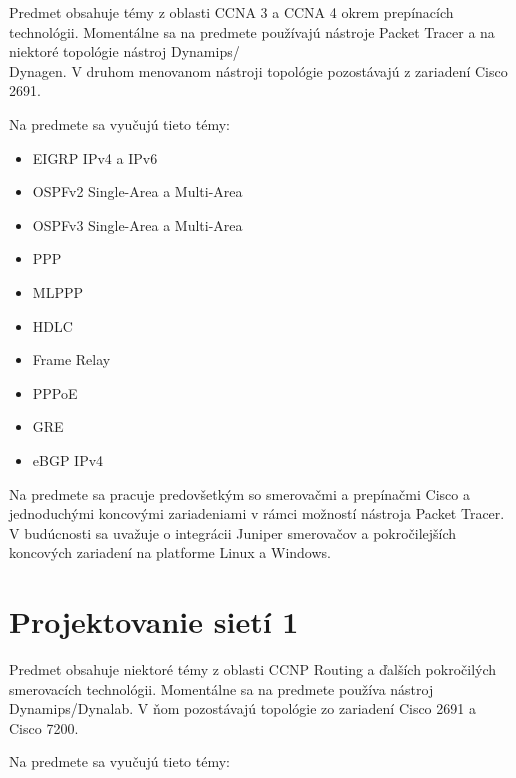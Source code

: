 Predmet obsahuje témy z oblasti CCNA 3 a CCNA 4 okrem prepínacích technológii. Momentálne sa na predmete používajú nástroje Packet Tracer a na niektoré topológie nástroj Dynamips/\\Dynagen. V druhom menovanom nástroji topológie pozostávajú z zariadení Cisco 2691.

Na predmete sa vyučujú tieto témy:

\begin{itemize}[noitemsep]
    \item EIGRP IPv4 a IPv6
    \item OSPFv2 Single-Area a Multi-Area
    \item OSPFv3 Single-Area a Multi-Area
    \item PPP
    \item MLPPP
    \item HDLC
    \item Frame Relay	
    \item PPPoE
    \item GRE
    \item eBGP IPv4
\end{itemize}

Na predmete sa pracuje predovšetkým so smerovačmi a prepínačmi Cisco a jednoduchými koncovými zariadeniami v rámci možností nástroja Packet Tracer. V budúcnosti sa uvažuje o integrácii Juniper smerovačov a pokročilejších koncových zariadení na platforme Linux a Windows.




\section{Projektovanie sietí 1}

Predmet obsahuje niektoré témy z oblasti CCNP Routing a ďalších pokročilých smerovacích technológii. Momentálne sa na predmete používa nástroj Dynamips/Dynalab. V ňom pozostávajú topológie zo zariadení Cisco 2691 a Cisco 7200.

Na predmete sa vyučujú tieto témy:

